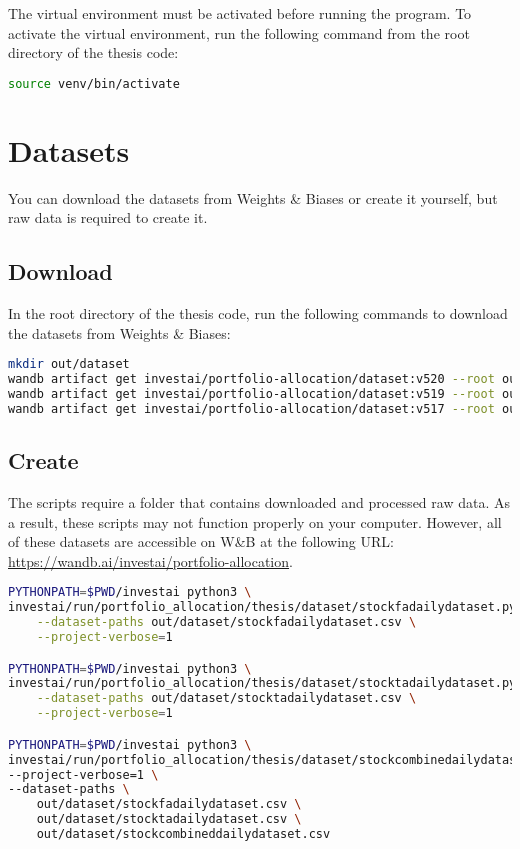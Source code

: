 \documentclass[../xlapes02]{subfiles}
\begin{document}
    The virtual environment must be activated before running the program. To activate the virtual environment, run the following command from the root directory of the thesis code:
    \begin{lstlisting}[language=bash]
source venv/bin/activate
    \end{lstlisting}


    \section{Datasets}
    You can download the datasets from Weights \& Biases or create it yourself, but raw data is required to create it.

    \subsection{Download}
    In the root directory of the thesis code, run the following commands to download the datasets from Weights \& Biases:
    \begin{lstlisting}[language=bash]
mkdir out/dataset
wandb artifact get investai/portfolio-allocation/dataset:v520 --root out/dataset
wandb artifact get investai/portfolio-allocation/dataset:v519 --root out/dataset
wandb artifact get investai/portfolio-allocation/dataset:v517 --root out/dataset
    \end{lstlisting}

    \subsection{Create}
    The scripts require a folder that contains downloaded and processed raw data. As a result, these scripts may not function properly on your computer. However, all of these datasets are accessible on W\&B at the following URL: \url{https://wandb.ai/investai/portfolio-allocation}.
    \begin{lstlisting}[language=bash]
PYTHONPATH=$PWD/investai python3 \
investai/run/portfolio_allocation/thesis/dataset/stockfadailydataset.py \
    --dataset-paths out/dataset/stockfadailydataset.csv \
    --project-verbose=1

PYTHONPATH=$PWD/investai python3 \
investai/run/portfolio_allocation/thesis/dataset/stocktadailydataset.py \
    --dataset-paths out/dataset/stocktadailydataset.csv \
    --project-verbose=1

PYTHONPATH=$PWD/investai python3 \
investai/run/portfolio_allocation/thesis/dataset/stockcombinedailydataset.py \
--project-verbose=1 \
--dataset-paths \
    out/dataset/stockfadailydataset.csv \
    out/dataset/stocktadailydataset.csv \
    out/dataset/stockcombineddailydataset.csv
    \end{lstlisting}
\end{document}
